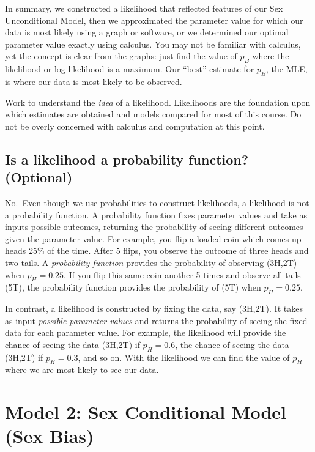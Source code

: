 \documentclass[
]{krantz}
\begin{document}
In summary, we constructed a likelihood that reflected features of our Sex Unconditional Model, then we approximated the parameter value for which our data is most likely using a graph or software, or we determined our optimal parameter value exactly using calculus. You may not be familiar with calculus, yet the concept is clear from the graphs: just find the value of \(p_B\) where the likelihood or log likelihood is a maximum. Our ``best'' estimate for \(p_B\), the MLE, is where our data is most likely to be observed.

Work to understand the \emph{idea} of a likelihood. Likelihoods are the foundation upon which estimates are obtained and models compared for most of this course. Do not be overly concerned with calculus and computation at this point.

\hypertarget{is-a-likelihood-a-probability-function-optional}{%
\subsection{Is a likelihood a probability function? (Optional)}\label{is-a-likelihood-a-probability-function-optional}}

No.~Even though we use probabilities to construct likelihoods, a likelihood is not a probability function. A probability function fixes parameter values and take as inputs possible outcomes, returning the probability of seeing different outcomes given the parameter value. For example, you flip a loaded coin which comes up heads 25\% of the time. After 5 flips, you observe the outcome of three heads and two tails. A \emph{probability function} provides the probability of observing (3H,2T) when \(p_H=0.25\). If you flip this same coin another 5 times and observe all tails (5T), the probability function provides the probability of (5T) when \(p_H=0.25\).

In contrast, a likelihood is constructed by fixing the data, say (3H,2T). It takes as input \emph{possible parameter values} and returns the probability of seeing the fixed data for each parameter value. For example, the likelihood will provide the chance of seeing the data (3H,2T) if \(p_H=0.6\), the chance of seeing the data (3H,2T) if \(p_H=0.3\), and so on. With the likelihood we can find the value of \(p_H\) where we are most likely to see our data.

\hypertarget{sex_conditional.sec}{%
\section{Model 2: Sex Conditional Model (Sex Bias)}\label{sex_conditional.sec}}
\end{document}
